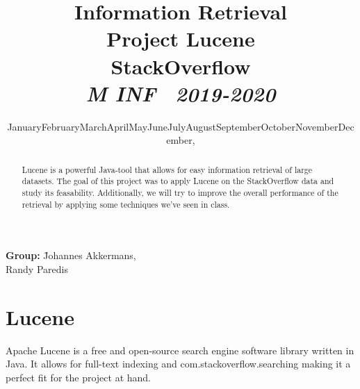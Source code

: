 \documentclass[11pt]{article}
\renewcommand{\today}{\ifcase \month \or January\or February\or March\or April\or May\or June\or July\or August\or September\or October\or November\or December\fi, \number \year}
\newcommand{\topic}{Project Lucene}
\newcommand{\paper}{StackOverflow\\
	\small{\textit{M INF \  2019-2020}}
}
\newcommand{\team}{
	\=Johannes Akkermans, \\\>Randy Paredis
}
\begin{document}
\title{\textmd{\textbf{Information Retrieval}}\\\normalsize\vspace{0.1in}\Large{\topic}\\\large{\paper}\Large\\\vspace{0.1in}}
\author{}
\date{\today}
\maketitle
\begin{center}
	\parbox{0cm}{
		\begin{tabbing}
		\textbf{Group:} \team
		\end{tabbing}
	}
\end{center}

\vspace*{1em}

\begin{abstract}
    Lucene is a powerful Java-tool that allows for easy information retrieval of large datasets. The goal of this project was to apply Lucene on the StackOverflow data and study its feasability. Additionally, we will try to improve the overall performance of the retrieval by applying some techniques we've seen in class.
\end{abstract}

\newpage


\section{Lucene}\label{sec:lucene}
Apache Lucene is a free and open-source search engine software library written in Java. It allows for full-text indexing and com.stackoverflow.searching making it a perfect fit for the project at hand. \cite{lucene-wiki}
\end{document}

